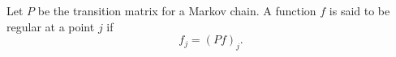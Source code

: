 Let $P$ be the transition matrix for a Markov chain. A function $f$ is said to be regular at a point $j$ if
$$f_j = (Pf)_j.$$
